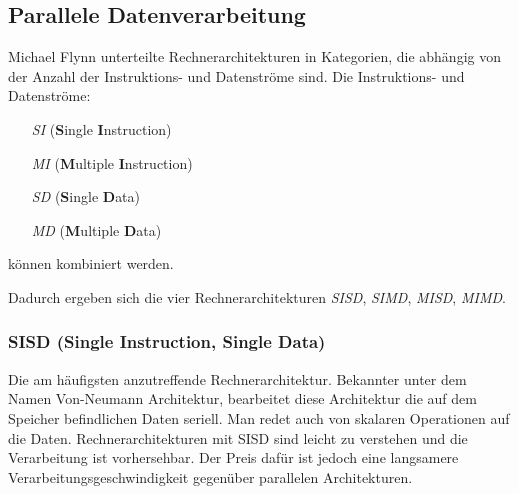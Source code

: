 \subsection{Parallele Datenverarbeitung}
\label{subsec:flynn}
Michael Flynn unterteilte Rechnerarchitekturen in Kategorien, die abhängig von der Anzahl der Instruktions- und Datenströme sind. \newline
Die Instruktions- und Datenströme:
\begin{enumerate}
\item[\textit{SI}] (\textbf{S}ingle \textbf{I}nstruction)
\item[\textit{MI}] (\textbf{M}ultiple \textbf{I}nstruction) 
\item[\textit{SD}] (\textbf{S}ingle \textbf{D}ata) 
\item[\textit{MD}] (\textbf{M}ultiple \textbf{D}ata) 
\end{enumerate}
können kombiniert werden. \newline

Dadurch ergeben sich die vier Rechnerarchitekturen \textit{SISD}, \textit{SIMD}, \textit{MISD}, \textit{MIMD}.
\subsubsection*{SISD (Single Instruction, Single Data)}
Die am häufigsten anzutreffende Rechnerarchitektur.
Bekannter unter dem Namen Von-Neumann Architektur, bearbeitet diese Architektur die auf dem Speicher befindlichen Daten seriell.
Man redet auch von skalaren Operationen auf die Daten.
Rechnerarchitekturen mit SISD sind leicht zu verstehen und die Verarbeitung ist vorhersehbar.
Der Preis dafür ist jedoch eine langsamere Verarbeitungsgeschwindigkeit gegenüber parallelen Architekturen.
